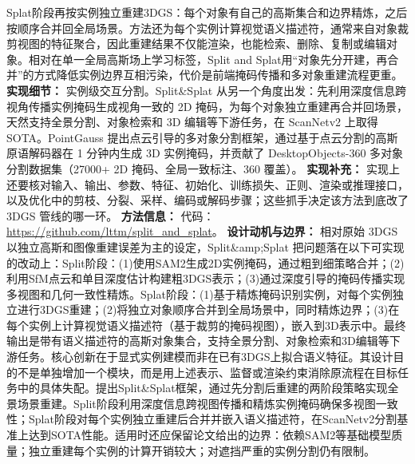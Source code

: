 Splat阶段再按实例独立重建3DGS：每个对象有自己的高斯集合和边界精炼，之后按顺序合并回全局场景。方法还为每个实例计算视觉语义描述符，通常来自对象裁剪视图的特征聚合，因此重建结果不仅能渲染，也能检索、删除、复制或编辑对象。相对在单一全局高斯场上学习标签，Split and Splat用“对象先分开建，再合并”的方式降低实例边界互相污染，代价是前端掩码传播和多对象重建流程更重。
\textbf{实现细节：} 实例级交互分割。Split\&Splat 从另一个角度出发：先利用深度信息跨视角传播实例掩码生成视角一致的 2D 掩码，为每个对象独立重建再合并回场景，天然支持全景分割、对象检索和 3D 编辑等下游任务，在 ScanNetv2 上取得 SOTA。PointGauss 提出点云引导的多对象分割框架，通过基于点云分割的高斯原语解码器在 1 分钟内生成 3D 实例掩码，并贡献了 DesktopObjects-360 多对象分割数据集（27000+ 2D 掩码、全局一致标注、360\textdegree{} 覆盖）。
\textbf{实现补充：} 实现上还要核对输入、输出、参数、特征、初始化、训练损失、正则、渲染或推理接口，以及优化中的剪枝、分裂、采样、编码或解码步骤；这些抓手决定该方法到底改了 3DGS 管线的哪一环。
\textbf{方法信息：} 代码：\url{https://github.com/lttm/split_and_splat}。
\textbf{设计动机与边界：} 相对原始 3DGS 以独立高斯和图像重建误差为主的设定，Split\&amp;Splat 把问题落在以下可实现的改动上：Split阶段：(1)使用SAM2生成2D实例掩码，通过粗到细策略合并；(2)利用SfM点云和单目深度估计构建粗3DGS表示；(3)通过深度引导的掩码传播实现多视图和几何一致性精炼。Splat阶段：(1)基于精炼掩码识别实例，对每个实例独立进行3DGS重建；(2)将独立对象顺序合并到全局场景中，同时精炼边界；(3)在每个实例上计算视觉语义描述符（基于裁剪的掩码视图），嵌入到3D表示中。最终输出是带有语义描述符的高斯对象集合，支持全景分割、对象检索和3D编辑等下游任务。核心创新在于显式实例建模而非在已有3DGS上拟合语义特征。其设计目的不是单独增加一个模块，而是用上述表示、监督或渲染约束消除原流程在目标任务中的具体失配。提出Split\&Splat框架，通过先分割后重建的两阶段策略实现全景场景重建。Split阶段利用深度信息跨视图传播和精炼实例掩码确保多视图一致性；Splat阶段对每个实例独立重建后合并并嵌入语义描述符，在ScanNetv2分割基准上达到SOTA性能。适用时还应保留论文给出的边界：依赖SAM2等基础模型质量；独立重建每个实例的计算开销较大；对遮挡严重的实例分割仍有限制。
